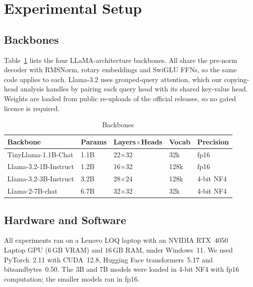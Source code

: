 \documentclass[conference]{IEEEtran}
\begin{document}
\section{Experimental Setup}
\subsection{Backbones}
Table~\ref{tab:backbones} lists the four LLaMA-architecture backbones. All share the pre-norm decoder with RMSNorm, rotary embeddings and SwiGLU FFNs, so the same code applies to each. Llama-3.2 uses grouped-query attention, which our copying-head analysis handles by pairing each query head with its shared key-value head. Weights are loaded from public re-uploads of the official releases, so no gated licence is required.

\begin{table}[t]
\caption{Backbones}
\label{tab:backbones}
\centering\footnotesize
\setlength{\tabcolsep}{4pt}
\begin{tabular}{@{}lllll@{}}
\toprule
Backbone & Params & Layers$\times$Heads & Vocab & Precision \\
\midrule
TinyLlama-1.1B-Chat & 1.1B & 22$\times$32 & 32k & fp16 \\
Llama-3.2-1B-Instruct & 1.2B & 16$\times$32 & 128k & fp16 \\
Llama-3.2-3B-Instruct & 3.2B & 28$\times$24 & 128k & 4-bit NF4 \\
Llama-2-7B-chat & 6.7B & 32$\times$32 & 32k & 4-bit NF4 \\
\bottomrule
\end{tabular}
\end{table}

\subsection{Hardware and Software}
All experiments ran on a Lenovo LOQ laptop with an NVIDIA RTX~4050 Laptop GPU (6\,GB VRAM) and 16\,GB RAM, under Windows~11. We used PyTorch~2.11 with CUDA~12.8, Hugging Face transformers~5.17 and bitsandbytes~0.50. The 3B and 7B models were loaded in 4-bit NF4 with fp16 computation; the smaller models ran in fp16.
\end{document}
